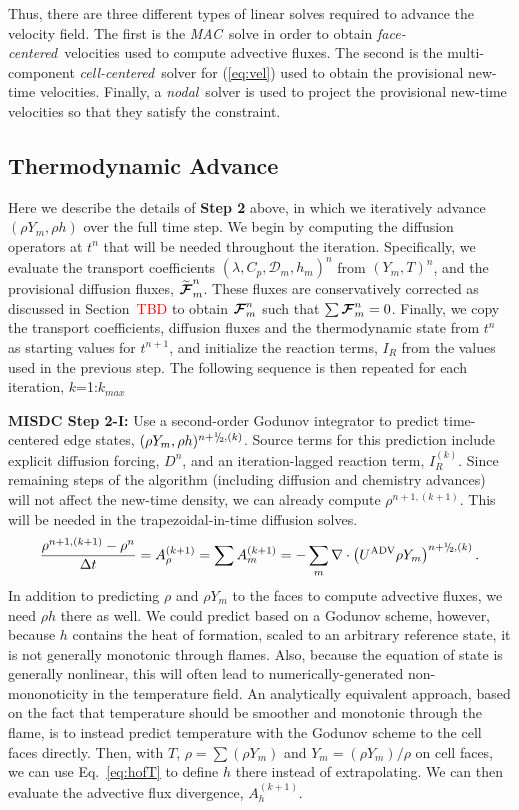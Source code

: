 Thus, there are three different types of linear solves required to advance the velocity field.  The first is the \textit{MAC}\ solve in order to obtain \textit{face-centered}\ velocities used to compute advective fluxes.  The second is the multi-component \textit{cell-centered}\ solver for (\ref{eq:vel}) used to obtain the provisional new-time velocities.  Finally, a \textit{nodal}\ solver is used to project the provisional new-time velocities so that they satisfy the constraint.

\subsection{Thermodynamic Advance}\label{sec:Thermodynamic Advance}
Here we describe the details of {\bf Step 2} above, in
which we iteratively advance $(\rho Y_m,\rho h)$ over the full time step.
We begin by computing the diffusion
operators at $t^n$ that will be needed throughout the iteration.  Specifically, we evaluate the transport coefficients
$(\lambda,C_p,\mathcal D_m,h_m)^n$ from $(Y_m,T)^n$, and the provisional diffusion
fluxes, $\widetilde{\boldsymbol{\cal F}}_m^n$.  These fluxes are conservatively
corrected as discussed in Section~\textcolor{red}{TBD} to obtain ${\boldsymbol{\cal F}}_m^n$ such that $\sum {\boldsymbol{\cal F}}_m^n = 0$.
Finally, we copy the transport coefficients, diffusion fluxes and the thermodynamic state from $t^n$ as starting values for
$t^{n+1}$, and initialize the reaction terms, $I_R$ from the values used in the previous step.
The following sequence is then repeated for each iteration, $k$=1:$k_{max}$

{\bf MISDC Step 2-I:} Use a second-order Godunov integrator to predict
time-centered edge states, $(\rho Y_m,\rho h)^{n+\myhalf,(k)}$.  Source terms for this prediction include
explicit diffusion forcing, $D^{n}$, and an iteration-lagged reaction term, $I_R^{(k)}$.
Since remaining steps of the algorithm (including diffusion and chemistry advances) will not affect the new-time density, we can already compute $\rho^{n+1,(k+1)}$.  This will be needed in the trapezoidal-in-time diffusion solves.
\begin{equation}
  \frac{\rho^{n+1,(k+1)} - \rho^n}{\Delta t} = A_{\rho}^{(k+1)} = \sum A_{m}^{(k+1)}
  = -\sum_m\nabla\cdot\left(\uadv\rho Y_m\right)^{n+\myhalf,(k)}.
\end{equation}
In addition to predicting $\rho$ and $\rho Y_m$ to the faces to compute advective fluxes, we need $\rho h$ there
as well. We could predict based on a Godunov scheme, however, because $h$ contains the heat of formation, scaled to an arbitrary reference state, it is not generally monotonic through flames. Also, because the equation of state is generally nonlinear, this will often lead to numerically-generated non-mononoticity in the temperature field. An analytically equivalent approach, based on the fact that temperature should be smoother and monotonic through the flame, is to instead predict temperature with the Godunov scheme to the cell faces directly.  Then, with $T$, $\rho = \sum (\rho Y_m)$ and $Y_m = (\rho Y_m)/\rho$ on cell faces, we can use Eq.~\ref{eq:hofT} to define $h$ there instead of extrapolating. We can then evaluate the advective flux divergence, $A_{h}^{(k+1)}$.



